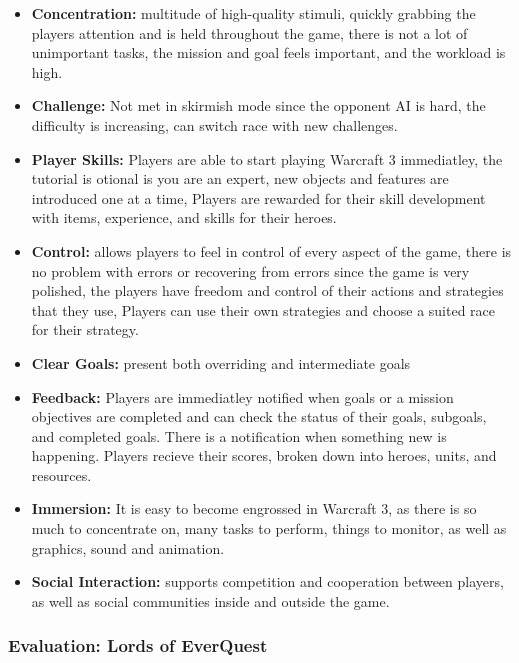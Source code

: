       \begin{itemize}
        \item {\bf Concentration:} multitude of high-quality stimuli, quickly grabbing the players attention and is held throughout the game, there is not a lot of unimportant tasks, the mission and goal feels important, and the workload is high.
        \item {\bf Challenge:} Not met in skirmish mode since the opponent AI is hard, the difficulty is increasing, can switch race with new challenges. 
        \item {\bf Player Skills:} Players are able to start playing Warcraft 3 immediatley, the tutorial is otional is you are an expert, new objects and features are introduced one at a time, Players are rewarded for their skill development with items, experience, and skills for their heroes. 
        \item {\bf Control:} allows players to feel in control of every aspect of the game, there is no problem with errors or recovering from errors since the game is very polished, the players have freedom and control of their actions and strategies that they use, Players can use their own strategies and choose a suited race for their strategy. 
        \item {\bf Clear Goals:} present both overriding and intermediate goals
        \item {\bf Feedback:} Players are immediatley notified when goals or a mission objectives are completed and can check the status of their goals, subgoals, and completed goals. There is a notification when something new is happening. Players recieve their scores, broken down into heroes, units, and resources. 
        \item {\bf Immersion:} It is easy to become engrossed in Warcraft 3, as there is so much to concentrate on, many tasks to perform, things to monitor, as well as graphics, sound and animation. 
        \item {\bf Social Interaction:} supports competition and cooperation between players, as well as social communities inside and outside the game. 
      \end{itemize}

    \subsubsection*{Evaluation: Lords of EverQuest}

